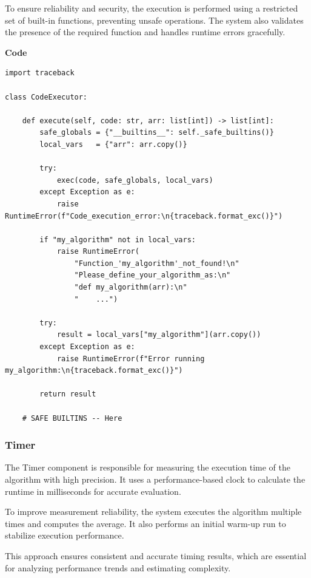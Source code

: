 \documentclass[12pt]{article}
\begin{document}
To ensure reliability and security, the execution is performed using a restricted set of built-in functions, preventing unsafe operations. The system also validates the presence of the required function and handles runtime errors gracefully.

\vspace{1cm}
\textbf{Code}

\begin{lstlisting}
import traceback

class CodeExecutor:

    def execute(self, code: str, arr: list[int]) -> list[int]:
        safe_globals = {"__builtins__": self._safe_builtins()}
        local_vars   = {"arr": arr.copy()}

        try:
            exec(code, safe_globals, local_vars)
        except Exception as e:
            raise RuntimeError(f"Code_execution_error:\n{traceback.format_exc()}")

        if "my_algorithm" not in local_vars:
            raise RuntimeError(
                "Function_'my_algorithm'_not_found!\n"
                "Please_define_your_algorithm_as:\n"
                "def my_algorithm(arr):\n"
                "    ...")

        try:
            result = local_vars["my_algorithm"](arr.copy())
        except Exception as e:
            raise RuntimeError(f"Error running my_algorithm:\n{traceback.format_exc()}")

        return result

    # SAFE BUILTINS -- Here
\end{lstlisting}

\newpage
\subsubsection{Timer}

The Timer component is responsible for measuring the execution time of the algorithm with high precision. It uses a performance-based clock to calculate the runtime in milliseconds for accurate evaluation.

To improve measurement reliability, the system executes the algorithm multiple times and computes the average. It also performs an initial warm-up run to stabilize execution performance.

This approach ensures consistent and accurate timing results, which are essential for analyzing performance trends and estimating complexity.
\end{document}
